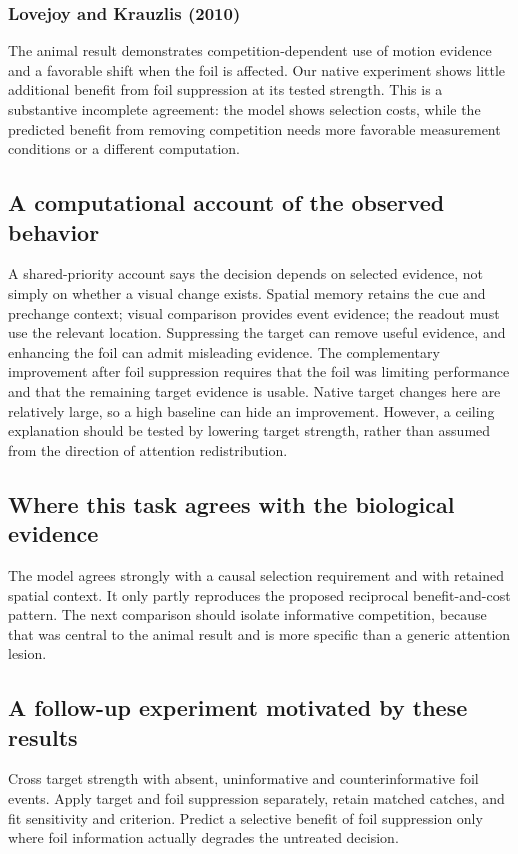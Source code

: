 \documentclass[11pt]{article}
\begin{document}
\subsubsection{Lovejoy and Krauzlis (2010)}
The animal result demonstrates competition-dependent use of motion evidence and a favorable shift when the foil is affected. Our native experiment shows little additional benefit from foil suppression at its tested strength. This is a substantive incomplete agreement: the model shows selection costs, while the predicted benefit from removing competition needs more favorable measurement conditions or a different computation. \cite{bio_lovejoy}

\subsection{A computational account of the observed behavior}
A shared-priority account says the decision depends on selected evidence, not simply on whether a visual change exists. Spatial memory retains the cue and prechange context; visual comparison provides event evidence; the readout must use the relevant location. Suppressing the target can remove useful evidence, and enhancing the foil can admit misleading evidence. The complementary improvement after foil suppression requires that the foil was limiting performance and that the remaining target evidence is usable. Native target changes here are relatively large, so a high baseline can hide an improvement. However, a ceiling explanation should be tested by lowering target strength, rather than assumed from the direction of attention redistribution.

\subsection{Where this task agrees with the biological evidence}
The model agrees strongly with a causal selection requirement and with retained spatial context. It only partly reproduces the proposed reciprocal benefit-and-cost pattern. The next comparison should isolate informative competition, because that was central to the animal result and is more specific than a generic attention lesion.

\subsection{A follow-up experiment motivated by these results}
Cross target strength with absent, uninformative and counterinformative foil events. Apply target and foil suppression separately, retain matched catches, and fit sensitivity and criterion. Predict a selective benefit of foil suppression only where foil information actually degrades the untreated decision.
\end{document}
